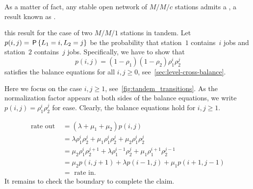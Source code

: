\documentclass[queueing-book.tex]{subfiles}
\begin{document}
As a matter of fact, any stable open network of $M/M/c$ stations
admits a , a result known as .

 this result for the case of two $M/M/1$ stations in tandem.
Let $p(i,j)=\,\mathsf{P}\left\{L_1=i, L_2=j\right\}$ be the probability that station~$1$ contains~$i$ jobs and station~$2$ contains~$j$ jobs.
Specifically, we have to show that
\begin{equation}
\label{eq:gers-1}
p(i,j) = (1-\rho_1)(1-\rho_2)\rho_1^i \rho_2^j
\end{equation}
satisfies the balance equations for all $i, j\geq 0$, see~\cref{sec:level-cross-balance}.


Here we focus on the case $i, j \geq 1$, see~\cref{fig:tandem_transitions}.
As the normalization factor appears at both sides of the balance equations, we write $p(i,j) = \rho_1^i \rho_2^j$ for ease.
Clearly, the balance equations hold for $i, j \geq 1$.
\begin{marginfigure}
 \caption{Transitions in  two stations in tandem.}
 \label{fig:tandem_transitions}
\end{marginfigure}
\begin{align*}
    \text{rate out } &=(\lambda + \mu_1 + \mu_2) p(i, j) \\
    &= \lambda  \rho_1^i \rho_2^j + \mu_1 \rho_1^{i} \rho_2^j + \mu_2 \rho_1^i\rho_2^j\\
    &=\mu_2 \rho_1^{i} \rho_2^{j+1} + \lambda \rho_1^{i-1} \rho_2^j + \mu_1 \rho_1^{i+1}\rho_2^{j-1}\\
                     &= \mu_2p(i, j+1) + \lambda p(i-1, j) + \mu_1 p(i+1, j-1)\\
    &= \text{ rate in}.
\end{align*}
It remains to check  the boundary to complete the claim.
\end{document}
